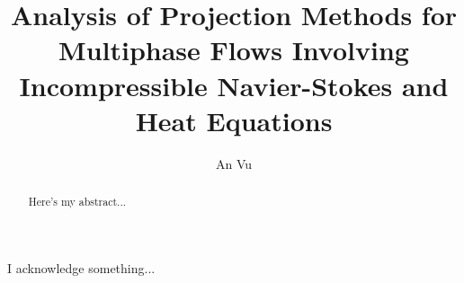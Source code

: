 
    \title{Analysis of Projection Methods for Multiphase Flows Involving Incompressible Navier-Stokes and Heat Equations}
    \author{An Vu} %
    \cochairfalse
    \threereaderstrue
    \fourreadersfalse
    \fivereadersfalse


\tablelisttrue
\figurelisttrue


\makecoverpages




\begin{acknowledgements}
\begin{doublespacing}
I acknowledge something...
\end{doublespacing}
\end{acknowledgements}


\begin{abstract}
\doublespacing
Here's my abstract...
\cleardoublepage
\end{abstract}

\singlespacing

\copyrighttrue
\makecontentspages
